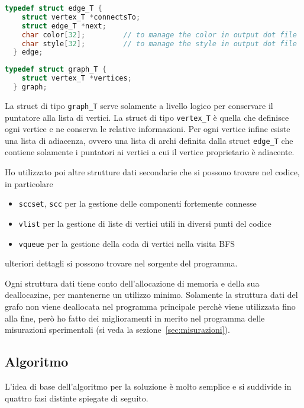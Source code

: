 \documentclass[a4paper,8pt]{article}
\theoremstyle{definition}
\theoremstyle{remark}
\begin{document}
\begin{lstlisting}[language=C]
  typedef struct edge_T {
    struct vertex_T *connectsTo;
    struct edge_T *next;
    char color[32];         // to manage the color in output dot file
    char style[32];         // to manage the style in output dot file
  } edge;
\end{lstlisting}

\begin{lstlisting}[language=C]
  typedef struct graph_T {
    struct vertex_T *vertices;
  } graph;
\end{lstlisting}

\noindent
La struct di tipo \texttt{graph\_T} serve solamente a livello logico per conservare
il puntatore alla lista di vertici. La struct di tipo \texttt{vertex\_T} è quella
che definisce ogni vertice e ne conserva le relative informazioni. Per ogni vertice
infine esiste una lista di adiacenza, ovvero una lista di archi definita dalla
struct \texttt{edge\_T} che contiene solamente i puntatori ai vertici a cui il vertice
proprietario è adiacente.

Ho utilizzato poi altre strutture dati secondarie che si possono trovare nel codice,
in particolare
\begin{itemize}
  \item \texttt{sccset}, \texttt{scc} per la gestione delle componenti fortemente
    connesse
  \item \texttt{vlist} per la gestione di liste di vertici utili in diversi punti
    del codice
  \item \texttt{vqueue} per la gestione della coda di vertici nella visita BFS
\end{itemize}
ulteriori dettagli si possono trovare nel sorgente del programma.

Ogni struttura dati tiene conto dell'allocazione di memoria e della sua deallocazine,
per mantenerne un utilizzo minimo. Solamente la struttura dati del grafo non viene
deallocata nel programma principale perchè viene utilizzata fino alla fine, però
ho fatto dei miglioramenti in merito nel programma delle misurazioni sperimentali
(si veda la sezione~\ref{sec:misurazioni}).

\subsection{Algoritmo}
L'idea di base dell'algoritmo per la soluzione è molto semplice e si suddivide in
quattro fasi distinte spiegate di seguito.
\end{document}
